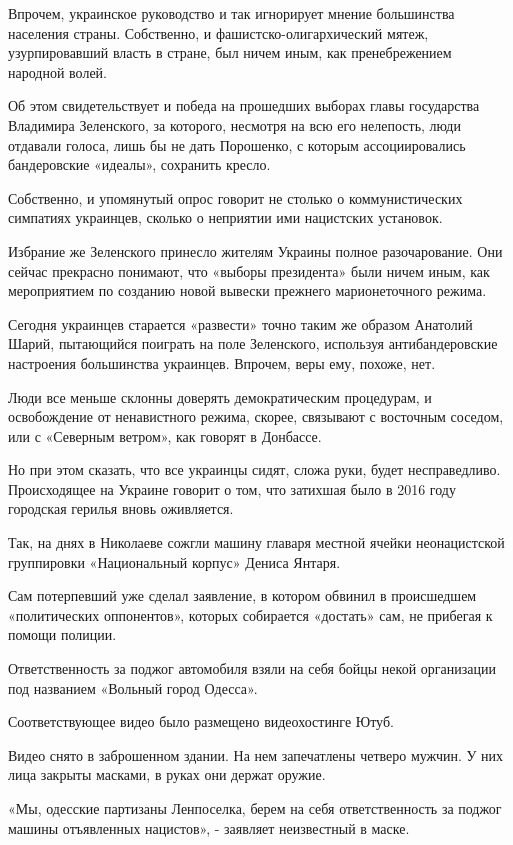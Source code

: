 Впрочем, украинское руководство и так игнорирует мнение большинства населения
страны. Собственно, и фашистско-олигархический мятеж, узурпировавший власть в
стране, был ничем иным, как пренебрежением народной волей.

Об этом свидетельствует и победа на прошедших выборах главы государства
Владимира Зеленского, за которого, несмотря на всю его нелепость, люди отдавали
голоса, лишь бы не дать Порошенко, с которым ассоциировались бандеровские
«идеалы», сохранить кресло.

Собственно, и упомянутый опрос говорит не столько о коммунистических симпатиях
украинцев, сколько о неприятии ими нацистских установок.

Избрание же Зеленского принесло жителям Украины полное разочарование. Они
сейчас прекрасно понимают, что «выборы президента» были ничем иным, как
мероприятием по созданию новой вывески прежнего марионеточного режима.

Сегодня украинцев старается «развести» точно таким же образом Анатолий Шарий,
пытающийся поиграть на поле Зеленского, используя антибандеровские настроения
большинства украинцев. Впрочем, веры ему, похоже, нет.

Люди все меньше склонны доверять демократическим процедурам, и освобождение от
ненавистного режима, скорее, связывают с восточным соседом, или с «Северным
ветром», как говорят в Донбассе.

Но при этом сказать, что все украинцы сидят, сложа руки, будет несправедливо.
Происходящее на Украине говорит о том, что затихшая было в 2016 году городская
герилья вновь оживляется.

Так, на днях в Николаеве сожгли машину главаря местной ячейки неонацистской
группировки «Национальный корпус» Дениса Янтаря.

Сам потерпевший уже сделал заявление, в котором обвинил в происшедшем
«политических оппонентов», которых собирается «достать» сам, не прибегая к
помощи полиции.

Ответственность за поджог автомобиля взяли на себя бойцы некой организации под
названием «Вольный город Одесса».

Соответствующее видео было размещено видеохостинге Ютуб.

Видео снято в заброшенном здании. На нем запечатлены четверо мужчин. У них лица
закрыты масками, в руках они держат оружие.

«Мы, одесские партизаны Ленпоселка, берем на себя ответственность за поджог
машины отъявленных нацистов», - заявляет неизвестный в маске.

